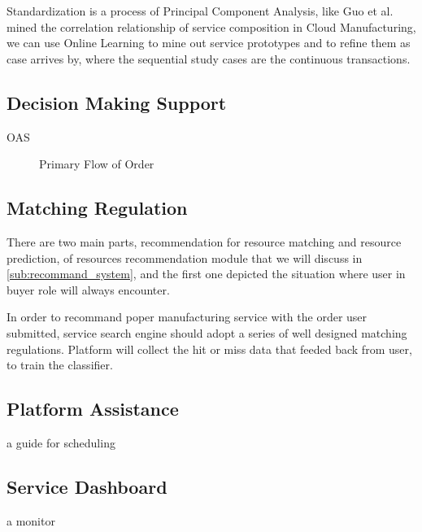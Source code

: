Standardization is a process of Principal Component Analysis, like Guo et al.\cite{Guo2011} mined the correlation relationship of service composition in Cloud Manufacturing, we can use Online Learning\cite{Shalev-Shwartz2011} to mine out service prototypes and to refine them as case arrives by, where the sequential study cases are the continuous transactions.

\subsection{Decision Making Support} %
\label{sub:decision_making_support}

OAS  
\begin{figure}[!h]
\caption{Primary Flow of Order}
\label{fig:orderflow}
\end{figure}


\subsection{Matching Regulation} %
\label{sub:matching_regulation}
There are two main parts, recommendation for resource matching and resource prediction, of resources recommendation module that we will discuss in \autoref{sub:recommand_system}, and the first one depicted the situation where user in buyer role will always encounter.

In order to recommand poper manufacturing service with the order user submitted, service search engine should adopt a series of well designed matching regulations. Platform will collect the hit or miss data that feeded back from user, to train the classifier.

\subsection{Platform Assistance} %
\label{sub:platform_assistance}
a guide for scheduling 

\subsection{Service Dashboard} %
\label{sub:service_dashboard}
a monitor
